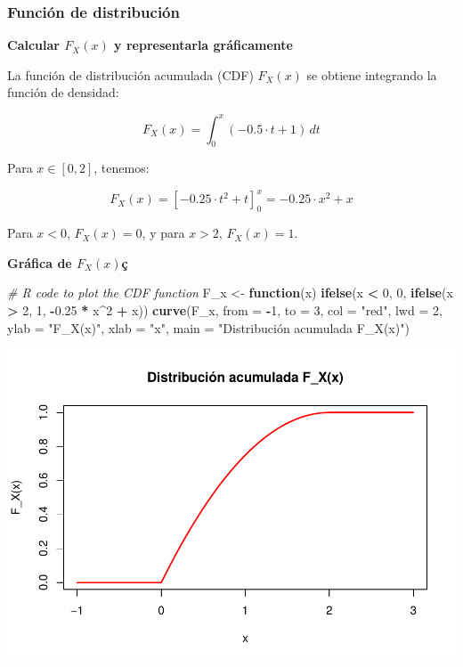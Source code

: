 \documentclass[
]{article}
\newenvironment{Shaded}{\begin{snugshade}}{\end{snugshade}}
\newcommand{\AttributeTok}[1]{\textcolor[rgb]{0.13,0.29,0.53}{#1}}
\newcommand{\CommentTok}[1]{\textcolor[rgb]{0.56,0.35,0.01}{\textit{#1}}}
\newcommand{\ControlFlowTok}[1]{\textcolor[rgb]{0.13,0.29,0.53}{\textbf{#1}}}
\newcommand{\DecValTok}[1]{\textcolor[rgb]{0.00,0.00,0.81}{#1}}
\newcommand{\FloatTok}[1]{\textcolor[rgb]{0.00,0.00,0.81}{#1}}
\newcommand{\FunctionTok}[1]{\textcolor[rgb]{0.13,0.29,0.53}{\textbf{#1}}}
\newcommand{\NormalTok}[1]{#1}
\newcommand{\OtherTok}[1]{\textcolor[rgb]{0.56,0.35,0.01}{#1}}
\newcommand{\SpecialCharTok}[1]{\textcolor[rgb]{0.81,0.36,0.00}{\textbf{#1}}}
\newcommand{\StringTok}[1]{\textcolor[rgb]{0.31,0.60,0.02}{#1}}
\begin{document}
\subsubsection{Función de distribución}\label{funciuxf3n-de-distribuciuxf3n}

\textbf{Calcular \(F_X(x)\) y representarla gráficamente}

La función de distribución acumulada (CDF) \(F_X(x)\) se obtiene integrando la función de densidad:

\[
F_X(x) = \int_0^x (-0.5 \cdot t + 1) \, dt
\]

Para \(x \in [0, 2]\), tenemos:

\[
F_X(x) = \left[-0.25 \cdot t^2 + t\right]_0^x = -0.25 \cdot x^2 + x
\]

Para \(x < 0\), \(F_X(x) = 0\), y para \(x > 2\), \(F_X(x) = 1\).

\textbf{Gráfica de \(F_X(x)\)ç}

\begin{Shaded}
\begin{Highlighting}[]
\CommentTok{\# R code to plot the CDF function}
\NormalTok{F\_x }\OtherTok{\textless{}{-}} \ControlFlowTok{function}\NormalTok{(x) }\FunctionTok{ifelse}\NormalTok{(x }\SpecialCharTok{\textless{}} \DecValTok{0}\NormalTok{, }\DecValTok{0}\NormalTok{, }\FunctionTok{ifelse}\NormalTok{(x }\SpecialCharTok{\textgreater{}} \DecValTok{2}\NormalTok{, }\DecValTok{1}\NormalTok{, }\SpecialCharTok{{-}}\FloatTok{0.25} \SpecialCharTok{*}\NormalTok{ x}\SpecialCharTok{\^{}}\DecValTok{2} \SpecialCharTok{+}\NormalTok{ x))}
\FunctionTok{curve}\NormalTok{(F\_x, }\AttributeTok{from =} \SpecialCharTok{{-}}\DecValTok{1}\NormalTok{, }\AttributeTok{to =} \DecValTok{3}\NormalTok{, }\AttributeTok{col =} \StringTok{"red"}\NormalTok{, }\AttributeTok{lwd =} \DecValTok{2}\NormalTok{, }\AttributeTok{ylab =} \StringTok{"F\_X(x)"}\NormalTok{, }\AttributeTok{xlab =} \StringTok{"x"}\NormalTok{,}
      \AttributeTok{main =} \StringTok{"Distribución acumulada F\_X(x)"}\NormalTok{)}
\end{Highlighting}
\end{Shaded}

\includegraphics{Ejercicios-de-Inferencia-Estadistica_files/figure-latex/unnamed-chunk-15-1.pdf}
\end{document}
